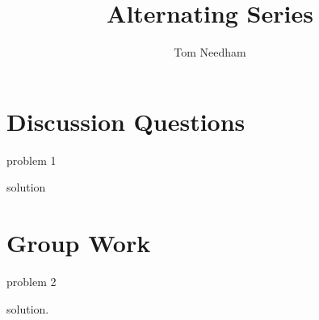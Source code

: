 \documentclass[]{ximera}
\author{Tom Needham}
\title[]{Alternating Series}
\begin{document}
\begin{abstract}
\end{abstract}
\maketitle

\vspace{-0.9in}

\section{Discussion Questions}

\begin{problem}
problem 1
\end{problem}

\begin{freeResponse}
solution
\end{freeResponse}


\section{Group Work}

\begin{problem}
problem 2
\end{problem}

\begin{freeResponse}
solution.
\end{freeResponse}
\end{document}
